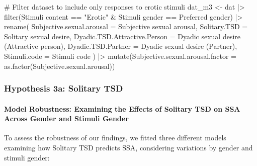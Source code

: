 \documentclass[
  bookmarksnumbered]{article}
\newenvironment{Shaded}{\begin{snugshade}}{\end{snugshade}}
\newcommand{\AttributeTok}[1]{\textcolor[rgb]{0.80,0.80,0.80}{#1}}
\newcommand{\CommentTok}[1]{\textcolor[rgb]{0.50,0.62,0.50}{#1}}
\newcommand{\FunctionTok}[1]{\textcolor[rgb]{0.94,0.94,0.56}{#1}}
\newcommand{\NormalTok}[1]{\textcolor[rgb]{0.80,0.80,0.80}{#1}}
\newcommand{\OtherTok}[1]{\textcolor[rgb]{0.94,0.94,0.56}{#1}}
\newcommand{\SpecialCharTok}[1]{\textcolor[rgb]{0.86,0.64,0.64}{#1}}
\newcommand{\StringTok}[1]{\textcolor[rgb]{0.80,0.58,0.58}{#1}}
\begin{document}
\begin{Shaded}
\begin{Highlighting}[]
\CommentTok{\# Filter dataset to include only responses to erotic stimuli}
\NormalTok{dat\_m3 }\OtherTok{\textless{}{-}}\NormalTok{ dat }\SpecialCharTok{|\textgreater{}}
  \FunctionTok{filter}\NormalTok{(}\StringTok{\textasciigrave{}}\AttributeTok{Stimuli content}\StringTok{\textasciigrave{}} \SpecialCharTok{==} \StringTok{"Erotic"} \SpecialCharTok{\&}
    \StringTok{\textasciigrave{}}\AttributeTok{Stimuli gender}\StringTok{\textasciigrave{}} \SpecialCharTok{==} \StringTok{\textasciigrave{}}\AttributeTok{Preferred gender}\StringTok{\textasciigrave{}}\NormalTok{) }\SpecialCharTok{|\textgreater{}}
  \FunctionTok{rename}\NormalTok{(}
    \AttributeTok{Subjective.sexual.arousal =} \StringTok{\textasciigrave{}}\AttributeTok{Subjective sexual arousal}\StringTok{\textasciigrave{}}\NormalTok{,}
    \AttributeTok{Solitary.TSD =} \StringTok{\textasciigrave{}}\AttributeTok{Solitary sexual desire}\StringTok{\textasciigrave{}}\NormalTok{,}
    \AttributeTok{Dyadic.TSD.Attractive.Person =} \StringTok{\textasciigrave{}}\AttributeTok{Dyadic sexual desire (Attractive person)}\StringTok{\textasciigrave{}}\NormalTok{,}
    \AttributeTok{Dyadic.TSD.Partner =} \StringTok{\textasciigrave{}}\AttributeTok{Dyadic sexual desire (Partner)}\StringTok{\textasciigrave{}}\NormalTok{,}
    \AttributeTok{Stimuli.code =} \StringTok{\textasciigrave{}}\AttributeTok{Stimuli code}\StringTok{\textasciigrave{}}
\NormalTok{  ) }\SpecialCharTok{|\textgreater{}}
  \FunctionTok{mutate}\NormalTok{(}\AttributeTok{Subjective.sexual.arousal.factor =} \FunctionTok{as.factor}\NormalTok{(Subjective.sexual.arousal))}
\end{Highlighting}
\end{Shaded}

\subsubsection{Hypothesis 3a: Solitary TSD}\label{hyp3a}

\paragraph{Model Robustness: Examining the Effects of Solitary TSD on SSA Across Gender and Stimuli Gender}\label{model-robustness-examining-the-effects-of-solitary-tsd-on-ssa-across-gender-and-stimuli-gender-1}

To assess the robustness of our findings, we fitted three different models examining how Solitary TSD predicts SSA, considering variations by gender and stimuli gender:
\end{document}
